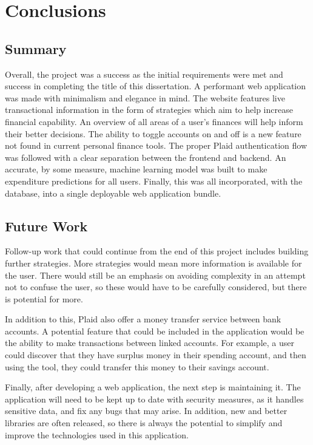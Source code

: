 \chapter{Conclusions}
\label{ch:conclusions}

\section{Summary}
Overall, the project was a success as the initial requirements were met and success in completing the title of this dissertation. A performant web application was made with minimalism and elegance in mind. The website features live transactional information in the form of strategies which aim to help increase financial capability. An overview of all areas of a user's finances will help inform their better decisions. The ability to toggle accounts on and off is a new feature not found in current personal finance tools. The proper Plaid authentication flow was followed with a clear separation between the frontend and backend. An accurate, by some measure, machine learning model was built to make expenditure predictions for all users. Finally, this was all incorporated, with the database, into a single deployable web application bundle.

\section{Future Work}
Follow-up work that could continue from the end of this project includes building further strategies. More strategies would mean more information is available for the user. There would still be an emphasis on avoiding complexity in an attempt not to confuse the user, so these would have to be carefully considered, but there is potential for more.

In addition to this, Plaid also offer a money transfer service between bank accounts. A potential feature that could be included in the application would be the ability to make transactions between linked accounts. For example, a user could discover that they have surplus money in their spending account, and then using the tool, they could transfer this money to their savings account.

Finally, after developing a web application, the next step is maintaining it. The application will need to be kept up to date with security measures, as it handles sensitive data, and fix any bugs that may arise. In addition, new and better libraries are often released, so there is always the potential to simplify and improve the technologies used in this application.